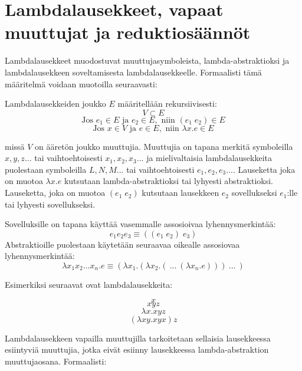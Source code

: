 \section{Lambdalausekkeet, vapaat muuttujat ja reduktiosäännöt}

Lambdalausekkeet muodostuvat muuttujasymboleista, lambda-abstraktioksi ja lambdalausekkeen soveltamisesta lambdalausekkeelle. Formaalisti tämä määritelmä voidaan muotoilla seuraavasti:

\begin{maar}[lambdalausekkeet]
Lambdalausekkeiden joukko $E$ määritellään rekursiivisesti: 
\[ V \subset E \]
\[ \text{Jos } e_{1} \in E \text{ ja } e_{2} \in E, \text{ niin }  (e_{1} \; e_{2}) \in E \]
\[ \text{Jos } x \in V \text{ ja } e \in E, \text{ niin } \lambda x.e \in E \]

missä $V$ on ääretön joukko muuttujia. Muuttujia on tapana merkitä symboleilla $x, y,z...$ tai vaihtoehtoisesti $x_{1}, x_{2}, x_{3}...$ ja mielivaltaisia lambdalausekkeita puolestaan symboleilla $L, N, M ...$ tai vaihtoehtoisesti $e_{1}, e_{2}, e_{3}...$.  Lauseketta joka on muotoa $\lambda x.e$ kutsutaan lambda-abstraktioksi tai lyhyesti abstraktioksi. Lauseketta, joka on muotoa $(e_{1} \; e_{2})$ kutsutaan lausekkeen $e_{2}$ sovellukseksi $e_{1}$:lle tai lyhyesti sovellukseksi.
\end{maar}

Sovelluksille on tapana käyttää vasemmalle assosioivaa lyhennysmerkintää: 
\[e_{1} e_{2} e_{3} \equiv ((e_{1} \; e_{2}) \; e_{3})\]
Abstraktioille puolestaan käytetään seuraavaa oikealle assosiovaa lyhennysmerkintää: 
\[ \lambda x_{1}x_{2}...x_{n}.e \equiv (\lambda x_{1} . ( \lambda x_{2} . ( \: ... \: ( \lambda x_{n} . e ))) \: ... \: ) \]

\par
Esimerkiksi seuraavat ovat lambdalausekkeita:

\[ x \]
\[ xyz \]
\[ \lambda x . xyz \]
\[ (\lambda xy . xyx) z \]


Lambdalausekkeen vapailla muuttujilla tarkoitetaan sellaisia lausekkeessa esiintyviä muuttujia, jotka eivät esiinny lausekkeessa lambda-abstraktion muuttujaosana. Formaalisti: 

